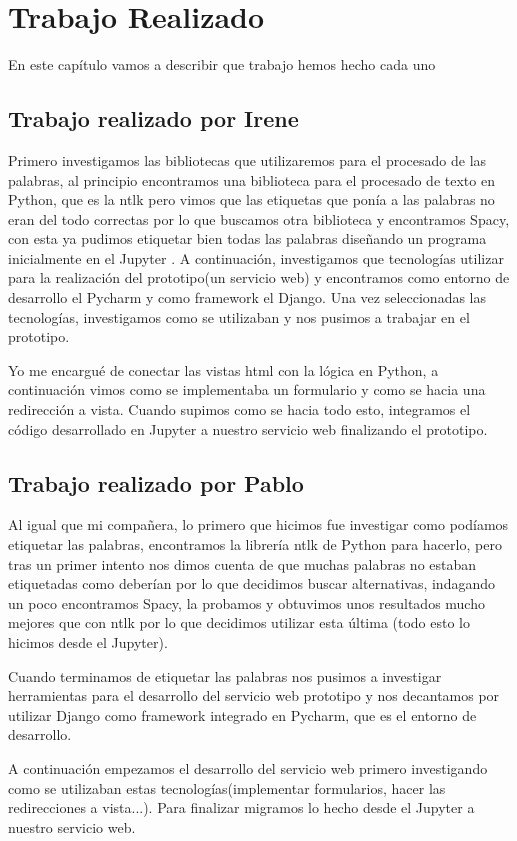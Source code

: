 \chapter{Trabajo Realizado}
\label{cap:TrabajoRealizado}

\begin{resumen}
En este capítulo vamos a describir que trabajo hemos hecho cada uno
\end{resumen}

\section{Trabajo realizado por Irene}
\label{cap:sec:trabajo_Irene}

Primero investigamos las bibliotecas que utilizaremos para el procesado de las palabras, al principio encontramos una biblioteca para el procesado de texto en Python, que es la ntlk pero vimos que las etiquetas que ponía a las palabras no eran del todo correctas por lo que buscamos otra biblioteca y encontramos Spacy, con esta ya pudimos etiquetar bien todas las palabras diseñando un programa inicialmente en el Jupyter . A continuación, investigamos que tecnologías utilizar para la realización del prototipo(un servicio web) y encontramos como entorno de desarrollo el Pycharm y como framework el Django. Una vez seleccionadas las tecnologías, investigamos como se utilizaban y nos pusimos a trabajar en el prototipo.

Yo me encargué de conectar las vistas html con la lógica en Python, a continuación vimos como se implementaba un formulario y como se hacia una redirección a vista. Cuando supimos como se hacia todo esto, integramos el código desarrollado en Jupyter a nuestro servicio web finalizando el prototipo.



\section{Trabajo realizado por Pablo}
\label{cap:sec:trabajo_Pablo}

Al igual que mi compañera, lo primero que hicimos fue investigar como podíamos etiquetar las palabras, encontramos la librería ntlk de Python para hacerlo, pero tras un primer intento nos dimos cuenta de que muchas palabras no estaban etiquetadas como deberían por lo que decidimos buscar alternativas, indagando un poco encontramos Spacy, la probamos y obtuvimos unos resultados mucho mejores que con ntlk por lo que decidimos utilizar esta última (todo esto lo hicimos desde el Jupyter). 

Cuando terminamos de etiquetar las palabras nos pusimos a investigar herramientas para el desarrollo del servicio web prototipo y nos decantamos por utilizar Django como framework integrado en Pycharm, que es el entorno de desarrollo.

A continuación empezamos el desarrollo del servicio web primero investigando como se utilizaban estas tecnologías(implementar formularios, hacer las redirecciones a vista...). Para finalizar migramos lo hecho desde el Jupyter a nuestro servicio web.